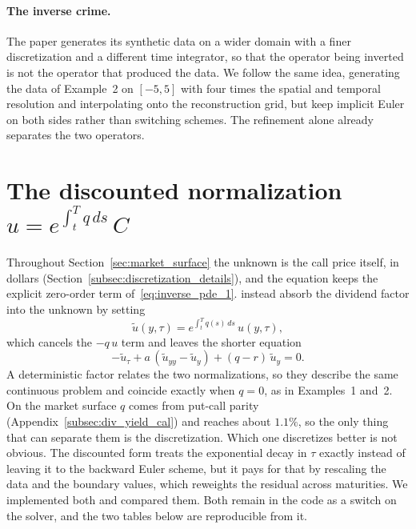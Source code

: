 \paragraph{The inverse crime.} The paper generates its synthetic data on a wider domain with a
finer discretization and a different time integrator, so that the operator being inverted is
not the operator that produced the data. We follow the same idea, generating the data of
Example~2 on $[-5,5]$ with four times the spatial and temporal resolution and interpolating
onto the reconstruction grid, but keep implicit Euler on both sides rather than switching
schemes. The refinement alone already separates the two operators.

\section{The discounted normalization $u = e^{\int_t^T q\,ds}\,C$}
\label{subsec:discounted_normalization}

Throughout Section~\ref{sec:market_surface} the unknown is the call price itself, in dollars
(Section~\ref{subsec:discretization_details}), and the equation keeps the explicit zero-order
term of~\eqref{eq:inverse_pde_1}.
\cite{egger2005tikhonov} instead absorb the dividend factor into the unknown by setting
\begin{equation*}
    \tilde{u}(y,\tau) = e^{\int_t^T q(s)\,ds}\,u(y,\tau),
\end{equation*}
which cancels the $-q\,u$ term and leaves the shorter equation
\begin{equation*}
    -\tilde{u}_\tau + a\,(\tilde{u}_{yy} - \tilde{u}_y) + (q - r)\,\tilde{u}_y = 0 .
\end{equation*}
A deterministic factor relates the two normalizations, so they describe the same continuous
problem and coincide exactly when $q = 0$, as in Examples~1 and~2.
On the market surface $q$ comes from put-call parity (Appendix~\ref{subsec:div_yield_cal})
and reaches about $1.1\%$, so the only thing that can separate them is the discretization.
Which one discretizes better is not obvious.
The discounted form treats the exponential decay in $\tau$ exactly instead of leaving it to the
backward Euler scheme, but it pays for that by rescaling the data and the boundary values,
which reweights the residual across maturities.
We implemented both and compared them.
Both remain in the code as a switch on the solver, and the two tables below are reproducible
from it.

